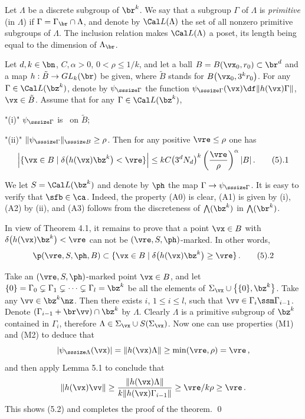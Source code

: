 Let $\Lambda$ be a discrete subgroup  of $\br^k$. We say that a subgroup $\Gamma$ of $\Lambda$ is {\it primitive\/} (in $\Lambda$) if $\Gamma = \Gamma_\br\cap \Lambda$, and denote by $\Cal L(\Lambda)$ the set of all nonzero  primitive subgroups of $\Lambda$. The inclusion relation makes $\Cal L(\Lambda)$ a poset, its length being equal to the dimension of $\Lambda_\br$.


  Let $d,k\in\bn$, $C,\alpha > 0$, $0 < \rho  \le 1/k$,  and let a ball $B = B(\vx_0,r_0)\subset \br^d$ and a map $h:\tilde B \to GL_k(\br)$ be given, where $\tilde B$ stands for $B\big(\vx_0,3^kr_0\big)$.  
 For any $\Gamma \in \Cal L(\bz^k)$, denote by $\psi_{\sssize \Gamma}$ the function $\psi_{\sssize \Gamma}(\vx) \df \|h(\vx)\Gamma\|$, $\vx\in \tilde B$. Assume that for any $\Gamma \in \Cal L(\bz^k)$,
\roster
\item"(i)" $\psi_{\sssize \Gamma}$ is \cag\ on $\tilde B$;
\item"(ii)" $\|\psi_{\sssize \Gamma}\|_{\sssize B} \ge \rho $.
\endroster
Then 
 for any  positive $ \vre \le \rho$ one has
$$
\left|\{\vx\in B\mid \delta\big(h(\vx)\bz^k\big) < \vre\}\right| \le kC \big(3^dN_d\big)^k \left(\frac\vre \rho \right)^\alpha  |B|\,.\tag 5.1
$$
\endproclaim
 

 We let $S = \Cal L(\bz^k)$ and denote by $\ph$ the map $\Gamma\to \psi_{\sssize \Gamma}$. It is easy to verify that  $\sfb\in\ca$.
Indeed, the property (A0) is clear, (A1) is given by (i), (A2) by (ii), and (A3) follows from the discreteness of $\bigwedge(\bz^k)$ in $\bigwedge(\br^k)$. 

In view of Theorem 4.1, it remains to prove that a point $\vx\in B$ with  $\delta\big(h(\vx)\bz^k\big) < \vre$ can not be  $(\vre,S,\ph)$-marked. In other words,
$$
\p(\vre,S,\ph,B) \subset  \{\vx\in B\mid \delta\big(h(\vx)\bz^k\big) \ge \vre\}\,.\tag 5.2
$$

Take an $(\vre,S,\ph)$-marked point $\vx\in B$, and let $\{0\} = \Gamma_0 \subsetneq \Gamma_1 \subsetneq\dots \subsetneq\Gamma_l = \bz^k$ be all the elements of $\Sigma_\vx \cup \big\{\{0\},\bz^k\big\}$. Take any $\vv\in\bz^k\nz$. Then there exists $i$, $1 \le i \le l$, such that $\vv\in \Gamma_i\ssm \Gamma_{i-1}$. Denote $(\Gamma_{i-1} + \br\vv)\cap \bz^k$ by $\Lambda$. Clearly $\Lambda$ is a primitive subgroup of $\bz^k$ contained in $\Gamma_i$, therefore $\Lambda \in \Sigma_\vx \cup S(\Sigma_\vx)$. Now one can use properties (M1) and (M2) to deduce that
$$
|\psi_{\sssize \Lambda}(\vx)| = \|h(\vx)\Lambda\| \ge \min(\vre, \rho) = \vre\,,
$$
and then apply Lemma 5.1 to conclude that 
$$
\|h(\vx)\vv\| \ge \frac{\|h(\vx)\Lambda\|}{k\|h(\vx)\Gamma_{i-1}\|} \ge \vre/k\rho  \ge \vre\,.
$$
This shows (5.2) and completes the proof of the theorem. \qed\enddemo


